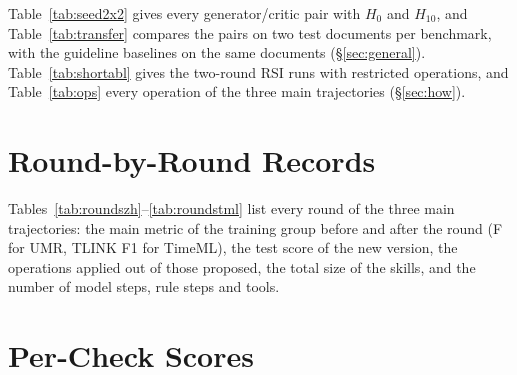 Table~\ref{tab:seed2x2} gives every generator/critic pair with $H_0$ and $H_{10}$, and Table~\ref{tab:transfer} compares the pairs on two test documents per benchmark, with the guideline baselines on the same documents (\S\ref{sec:general}). Table~\ref{tab:shortabl} gives the two-round RSI runs with restricted operations, and Table~\ref{tab:ops} every operation of the three main trajectories (\S\ref{sec:how}).








\section{Round-by-Round Records}
\label{app:rounds}

Tables~\ref{tab:roundszh}--\ref{tab:roundstml} list every round of the three main trajectories: the main metric of the training group before and after the round (F for UMR, TLINK F1 for TimeML), the test score of the new version, the operations applied out of those proposed, the total size of the skills, and the number of model steps, rule steps and tools.

\begin{table}[h]
\centering\small
\setlength{\tabcolsep}{3pt}

\caption{Rounds of \sys on Chinese UMR (AnCast++ F).}
\label{tab:roundszh}
\end{table}

\begin{table}[h]
\centering\small
\setlength{\tabcolsep}{3pt}

\caption{Rounds of \sys on English UMR (AnCast++ F).}
\label{tab:roundsen}
\end{table}

\begin{table}[h]
\centering\small
\setlength{\tabcolsep}{3pt}

\caption{Rounds of \sys on TimeML, trained on platinum documents (TLINK F1).}
\label{tab:roundstml}
\end{table}

\section{Per-Check Scores}
\label{app:checks}

\begin{table}[h]
\centering\scriptsize
\setlength{\tabcolsep}{3pt}

\caption{umrjudge checks on the Chinese test documents, $H_0$ and $H_{10}$ (Haiku / Haiku).}
\label{tab:judgezh}
\end{table}

